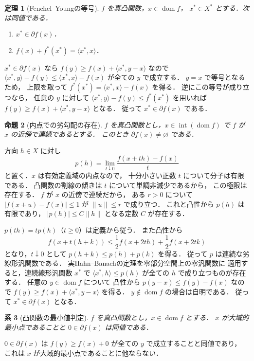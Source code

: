 \documentclass[a5paper,10pt,onecolumn]{jsarticle}
\makeatletter
\theoremstyle{mathnotetheorem}
\newtheorem{theorem}{定理}[section]
\newtheorem{proposition}[theorem]{命題}
\newtheorem{corollary}[theorem]{系}
\renewcommand{\proofname}{証明}
\renewenvironment{proof}[1][\proofname]{%
  \par\pushQED{\qed}\normalfont\topsep4\p@\@plus2\p@\relax
  \trivlist\item[\hskip\labelsep\bfseries #1]\ignorespaces
}{\popQED\endtrivlist\@endpefalse}
\newcommand{\norm}[1]{\lVert #1\rVert}
\makeatother
\begin{document}
\begin{theorem}[Fenchel--Youngの等号]\label{thm:subgrad}
$f$ を真凸関数，$x\in\operatorname{dom}f$，
$x^*\in X^*$ とする．次は同値である．
\begin{enumerate}
\item $x^*\in\partial f(x)$．
\item $f(x)+f^*(x^*)=\langle x^*,x\rangle$．
\end{enumerate}
\end{theorem}
\begin{proof}
$x^*\in\partial f(x)$ なら
$f(y)\ge f(x)+\langle x^*,y-x\rangle$ なので
$\langle x^*,y\rangle-f(y)
 \le\langle x^*,x\rangle-f(x)$ が全ての $y$ で成立する．
$y=x$ で等号となるため，
上限を取って
$f^*(x^*)=\langle x^*,x\rangle-f(x)$ を得る．
逆にこの等号が成り立つなら，
任意の $y$ に対して
$\langle x^*,y\rangle-f(y)\le f^*(x^*)$
を用いれば
$f(y)\ge f(x)+\langle x^*,y-x\rangle$ となる．
従って $x^*\in\partial f(x)$ である．
\end{proof}

\begin{proposition}[内点での劣勾配の存在]\label{prop:subgrad-exists}
$f$ を真凸関数とし，$x\in\operatorname{int}(\operatorname{dom}f)$
で $f$ が $x$ の近傍で連続であるとする．
このとき $\partial f(x)\ne\varnothing$ である．
\end{proposition}
\begin{proof}
方向 $h\in X$ に対し
\[
 p(h)=\lim_{t\downarrow0}
 \frac{f(x+th)-f(x)}t
\]
と置く．$x$ は有効定義域の内点なので，
十分小さい正数 $t$ について分子は有限である．
凸関数の割線の傾きは $t$ について単調非減少であるから，
この極限は存在する．
$f$ が $x$ の近傍で連続だから，
ある $r>0$ について
$|f(x+u)-f(x)|\le1$ が $\norm u\le r$ で成り立つ．
これと凸性から $p(h)$ は有限であり，
$|p(h)|\le C\norm h$ となる定数 $C$ が存在する．

$p(th)=tp(h)$（$t\ge0$）は定義から従う．
また凸性から
\[
 f(x+t(h+k))
 \le\frac12f(x+2th)+\frac12f(x+2tk)
\]
となり，$t\downarrow0$ として
$p(h+k)\le p(h)+p(k)$ を得る．
従って $p$ は連続な劣線形汎関数である．
実Hahn--Banachの定理を零部分空間上の零汎関数に
適用すると，連続線形汎関数 $x^*$ で
$\langle x^*,h\rangle\le p(h)$
が全ての $h$ で成り立つものが存在する．
任意の $y\in\operatorname{dom}f$ について
凸性から
$p(y-x)\le f(y)-f(x)$ なので
$f(y)\ge f(x)+\langle x^*,y-x\rangle$ を得る．
$y\notin\operatorname{dom}f$ の場合は自明である．
従って $x^*\in\partial f(x)$ となる．
\end{proof}

\begin{corollary}[凸関数の最小値判定]\label{cor:optimality}
$f$ を真凸関数とし，$x\in\operatorname{dom}f$ とする．
$x$ が大域的最小点であることと
$0\in\partial f(x)$ は同値である．
\end{corollary}
\begin{proof}
$0\in\partial f(x)$ は
$f(y)\ge f(x)+0$ が全ての $y$ で成立することと同値であり，
これは $x$ が大域的最小点であることに他ならない．
\end{proof}
\end{document}
